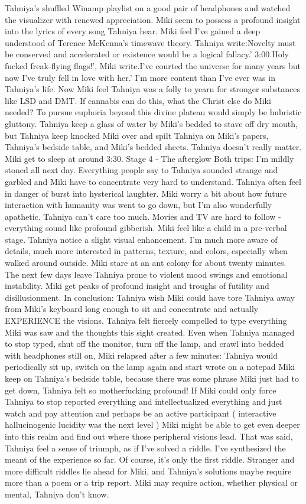 \documentclass[12pt]{book}
\begin{document}
Tahniya's shuffled Winamp playlist on a good pair of headphones and watched the visualizer with renewed appreciation. Miki seem to possess a profound insight into the lyrics of every song Tahniya hear. Miki feel I've gained a deep understood of Terence McKenna's timewave theory. Tahniya write:Novelty must be conserved and accelerated or existence would be a logical fallacy.' 3:00.Holy fucked freak-flying flags!', Miki write.I've courted the universe for many years but now I've truly fell in love with her.' I'm more content than I've ever was in Tahniya's life. Now Miki feel Tahniya was a folly to yearn for stronger substances like LSD and DMT. If cannabis can do this, what the Christ else do Miki needed? To pursue euphoria beyond this divine plateau would simply be hubristic gluttony. Tahniya keep a glass of water by Miki's bedded to stave off dry mouth, but Tahniya keep knocked Miki over and spilt Tahniya on Miki's papers, Tahniya's bedside table, and Miki's bedded sheets. Tahniya doesn't really matter. Miki get to sleep at around 3:30. Stage 4 - The afterglow Both trips: I'm mildly stoned all next day. Everything people say to Tahniya sounded strange and garbled and Miki have to concentrate very hard to understand. Tahniya often feel in danger of burst into hysterical laughter. Miki worry a bit about how future interaction with humanity was went to go down, but I'm also wonderfully apathetic. Tahniya can't care too much. Movies and TV are hard to follow - everything sound like profound gibberish. Miki feel like a child in a pre-verbal stage. Tahniya notice a slight visual enhancement. I'm much more aware of details, much more interested in patterns, texture, and colors, especially when walked around outside. Miki stare at an ant colony for about twenty minutes. The next few days leave Tahniya prone to violent mood swings and emotional instability. Miki get peaks of profound insight and troughs of futility and disillusionment. In conclusion: Tahniya wish Miki could have tore Tahniya away from Miki's keyboard long enough to sit and concentrate and actually EXPERIENCE the visions. Tahniya felt fiercely compelled to type everything Miki was saw and the thoughts this sight created. Even when Tahniya managed to stop typed, shut off the monitor, turn off the lamp, and crawl into bedded with headphones still on, Miki relapsed after a few minutes: Tahniya would periodically sit up, switch on the lamp again and start wrote on a notepad Miki keep on Tahniya's bedside table, because there was some phrase Miki just had to get down, Tahniya felt so motherfucking profound! If Miki could only force Tahniya to stop reported everything and intellectualized everything and just watch and pay attention and perhaps be an active participant ( interactive hallucinogenic lucidity was the next level ) Miki might be able to get even deeper into this realm and find out where those peripheral visions lead. That was said, Tahniya feel a sense of triumph, as if I've solved a riddle. I've synthesized the meant of the experience so far. Of course, it's only the first riddle. Stranger and more difficult riddles lie ahead for Miki, and Tahniya's solutions maybe require more than a poem or a trip report. Miki may require action, whether physical or mental, Tahniya don't know.
\end{document}

